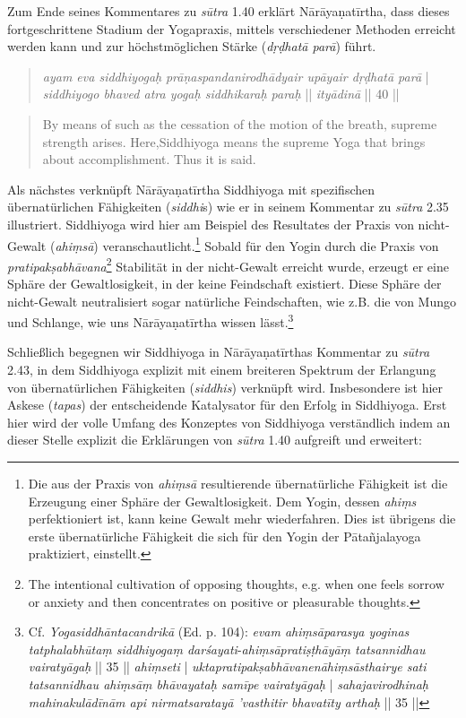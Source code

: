 Zum Ende seines Kommentares zu \textit{sūtra} 1.40 erklärt Nārāyaṇatīrtha, dass dieses fortgeschrittene Stadium der Yogapraxis, mittels verschiedener Methoden erreicht werden kann und zur höchstmöglichen Stärke (\textit{dṛḍhatā parā}) führt.

\begin{quote}
  \textit{ayam eva siddhiyogaḥ}
  \textit{prāṇaspandanirodhādyair upāyair dṛḍhatā parā} | 
  \textit{siddhiyogo bhaved atra yogaḥ siddhikaraḥ paraḥ} ||
  \textit{ityādinā} || 40 ||
\end{quote}
\begin{quote}
By means of such as the cessation of the motion of the breath, supreme strength arises. Here,Siddhiyoga means the supreme Yoga that brings about accomplishment. Thus it is said.
\end{quote}

Als nächstes verknüpft Nārāyaṇatīrtha Siddhiyoga mit spezifischen übernatürlichen Fähigkeiten (\textit{siddhi}s) wie er in seinem Kommentar zu \textit{sūtra} 2.35 illustriert. Siddhiyoga wird hier am Beispiel des Resultates der Praxis von nicht-Gewalt (\textit{ahiṃsā}) veranschautlicht.\footnote{Die aus der Praxis von \textit{ahiṃsā} resultierende übernatürliche Fähigkeit ist die Erzeugung einer Sphäre der Gewaltlosigkeit. Dem Yogin, dessen \textit{ahiṃs} perfektioniert ist, kann keine Gewalt mehr wiederfahren. Dies ist übrigens die erste übernatürliche Fähigkeit die sich für den Yogin der Pātañjalayoga praktiziert, einstellt.} Sobald für den Yogin durch die Praxis von \textit{pratipakṣabhāvana}\footnote{The intentional cultivation of opposing thoughts, e.g. when one feels sorrow or anxiety and then concentrates on positive or pleasurable thoughts.} Stabilität in der nicht-Gewalt erreicht wurde, erzeugt er eine Sphäre der Gewaltlosigkeit, in der keine Feindschaft existiert. Diese Sphäre der nicht-Gewalt neutralisiert sogar natürliche Feindschaften, wie z.B. die von Mungo und Schlange, wie uns Nārāyaṇatīrtha wissen lässt.\footnote{Cf. \textit{Yogasiddhāntacandrikā} (Ed. p. 104): \textit{evam ahiṃsāparasya yoginas tatphalabhūtaṃ siddhiyogaṃ darśayati}-\textit{ahiṃsāpratiṣṭhāyāṃ tatsannidhau vairatyāgaḥ} || 35 || \textit{ahiṃseti} | \textit{uktapratipakṣabhāvanenāhiṃsāsthairye sati tatsannidhau ahiṃsāṃ bhāvayataḥ samīpe vairatyāgaḥ} | \textit{sahajavirodhinaḥ mahinakulādīnām api nirmatsaratayā 'vasthitir bhavatīty arthaḥ} || 35 ||}

Schließlich begegnen wir Siddhiyoga in Nārāyaṇatīrthas Kommentar zu \textit{sūtra} 2.43, in dem Siddhiyoga explizit mit einem breiteren Spektrum der Erlangung von übernatürlichen Fähigkeiten (\textit{siddhis}) verknüpft wird. Insbesondere ist hier Askese (\textit{tapas}) der entscheidende Katalysator für den Erfolg in Siddhiyoga. Erst hier wird der volle Umfang des Konzeptes von Siddhiyoga verständlich indem an dieser Stelle explizit die Erklärungen von \textit{sūtra} 1.40 aufgreift und erweitert:

